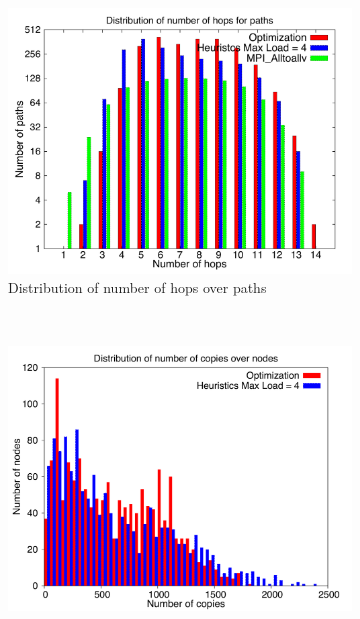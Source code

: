 \begin{figure}[!htbp]
        \centering
        \begin{subfigure}[b]{0.49\textwidth}
                \includegraphics[width=\textwidth]{report_figures/constantr/27_2048/hop_histo.pdf}
                \caption{Distribution of number of hops over paths}
                \label{fig:27_2048_hop}
        \end{subfigure}%
        ~ %
        \begin{subfigure}[b]{0.49\textwidth}
                \includegraphics[width=\textwidth]{report_figures/constantr/27_2048/copy_histo.pdf}

\end{subfigure}
\end{figure}

